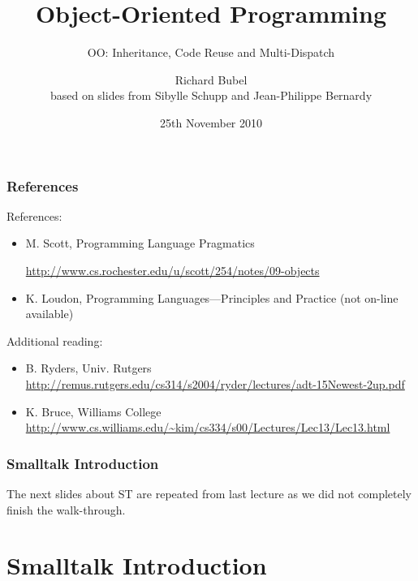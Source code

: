 \documentclass[handout]{beamer}
\title[OOP]{Object-Oriented Programming}
\subtitle[Inheritance, Reuse etc.]{OO: Inheritance, Code Reuse and Multi-Dispatch}
\author[Richard Bubel] %
{Richard Bubel \\ based on slides from Sibylle Schupp and Jean-Philippe Bernardy}
\institute[CTH]{Chalmers University of Technology}
\date{25th November 2010}%
\begin{document}
\begin{frame}
  \titlepage
\end{frame}

\begin{frame}[fragile]
\frametitle{References}
References:
\begin{itemize}
\item M. Scott, Programming Language Pragmatics

\url{http://www.cs.rochester.edu/u/scott/254/notes/09-objects}
\item K. Loudon, Programming Languages---Principles and Practice
(not on-line available)
\end{itemize}

Additional reading:
\begin{itemize}
\item B. Ryders, Univ. Rutgers
\url{
http://remus.rutgers.edu/cs314/s2004/ryder/lectures/adt-15Newest-2up.pdf
}
%
\item K. Bruce, Williams College
\url{
http://www.cs.williams.edu/~kim/cs334/s00/Lectures/Lec13/Lec13.html}
\end{itemize}
\end{frame}

\begin{frame}[fragile]
\frametitle{Smalltalk Introduction}
The next slides about ST are repeated from last lecture as we did not
completely finish the walk-through. 
\end{frame}



\section{Smalltalk Introduction}
\end{document}
